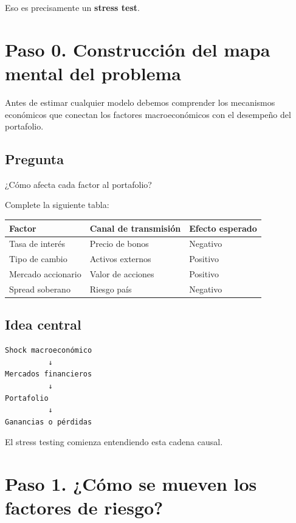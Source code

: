 \documentclass[11pt]{article}
\begin{document}
Eso es precisamente un \textbf{stress test}.

\section{Paso 0. Construcción del mapa mental del problema}

Antes de estimar cualquier modelo debemos comprender los mecanismos económicos que conectan los factores macroeconómicos con el desempeño del portafolio.

\subsection*{Pregunta}

¿Cómo afecta cada factor al portafolio?

Complete la siguiente tabla:

\begin{center}
\begin{tabular}{lll}
\toprule
Factor & Canal de transmisión & Efecto esperado \\
\midrule
Tasa de interés & Precio de bonos & Negativo \\
Tipo de cambio & Activos externos & Positivo \\
Mercado accionario & Valor de acciones & Positivo \\
Spread soberano & Riesgo país & Negativo \\
\bottomrule
\end{tabular}
\end{center}

\subsection*{Idea central}

\begin{center}
\begin{verbatim}
Shock macroeconómico
          ↓
Mercados financieros
          ↓
Portafolio
          ↓
Ganancias o pérdidas
\end{verbatim}
\end{center}

El stress testing comienza entendiendo esta cadena causal.

\section{Paso 1. ¿Cómo se mueven los factores de riesgo?}
\end{document}
